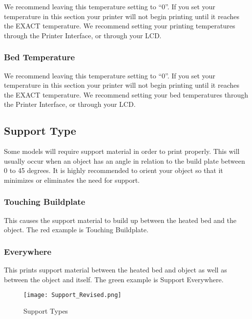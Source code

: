 We recommend leaving this temperature setting to “0”. If you set your temperature in this section your printer will not begin printing until it reaches the EXACT temperature. We recommend setting your printing temperatures through the Printer Interface, or through your LCD.

\subsubsection{Bed Temperature}
We recommend leaving this temperature setting to “0”. If you set your temperature in this section your printer will not begin printing until it reaches the EXACT temperature. We recommend setting your bed temperatures through the Printer Interface, or through your LCD.

\subsection{Support Type}
Some models will require support material in order to print properly. This will usually occur when an object has an angle in relation to the build plate between 0 to 45 degrees. It is highly recommended to orient your object so that it minimizes or eliminates the need for support.

\subsubsection{Touching Buildplate}
This causes the support material to build up between the heated bed and the object. The red example is Touching Buildplate.

\subsubsection{Everywhere}
This prints support material between the heated bed and object as well as between the object and itself. The green example is Support Everywhere.
\begin{figure}[H]
\centering
\texttt{[image: Support\_Revised.png]}
\caption{Support Types}
\label{fig:Different Types of Support}
\end{figure}

